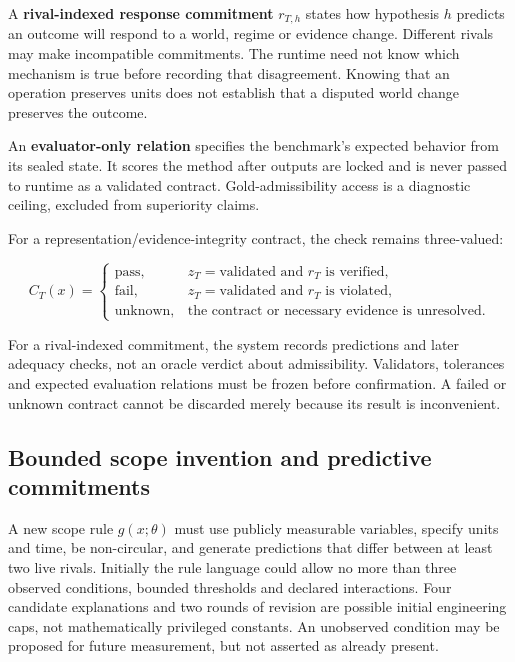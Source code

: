 \documentclass[11pt,a4paper]{article}
\begin{document}
A \textbf{rival-indexed response commitment} \(r_{T,h}\) states how
hypothesis \(h\) predicts an outcome will respond to a world, regime or
evidence change. Different rivals may make incompatible commitments. The
runtime need not know which mechanism is true before recording that
disagreement. Knowing that an operation preserves units does not
establish that a disputed world change preserves the outcome.

An \textbf{evaluator-only relation} specifies the benchmark's expected
behavior from its sealed state. It scores the method after outputs are
locked and is never passed to runtime as a validated contract.
Gold-admissibility access is a diagnostic ceiling, excluded from
superiority claims.

For a representation/evidence-integrity contract, the check remains
three-valued:

\[
C_T(x)=\begin{cases}
\mathrm{pass},&z_T=\mathrm{validated}\text{ and }r_T\text{ is verified},\\
\mathrm{fail},&z_T=\mathrm{validated}\text{ and }r_T\text{ is violated},\\
\mathrm{unknown},&\text{the contract or necessary evidence is unresolved}.
\end{cases}
\]

For a rival-indexed commitment, the system records predictions and later
adequacy checks, not an oracle verdict about admissibility. Validators,
tolerances and expected evaluation relations must be frozen before
confirmation. A failed or unknown contract cannot be discarded merely
because its result is inconvenient.

\subsection{Bounded scope invention and predictive
commitments}\label{bounded-scope-invention-and-predictive-commitments}

A new scope rule \(g(x;\theta)\) must use publicly measurable variables,
specify units and time, be non-circular, and generate predictions that
differ between at least two live rivals. Initially the rule language
could allow no more than three observed conditions, bounded thresholds
and declared interactions. Four candidate explanations and two rounds of
revision are possible initial engineering caps, not mathematically
privileged constants. An unobserved condition may be proposed for future
measurement, but not asserted as already present.
\end{document}

